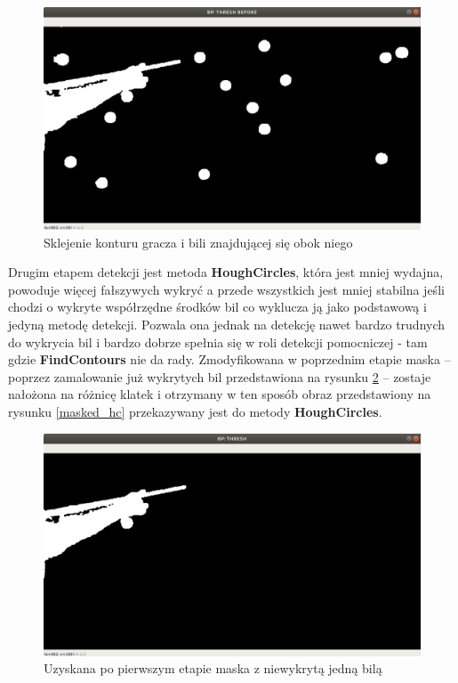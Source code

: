 \documentclass[12pt]{article}
\begin{document}
\begin{enumerate} [noitemsep]
    \begin{figure}[!ht]
        \centering
        \includegraphics[width=15cm]{./images/obrazki/bp/thresh_before_hc2.png}
        \caption{Sklejenie konturu gracza i bili znajdującej się obok niego}
        \label{thresh_before_hc}
    \end{figure}


    Drugim etapem detekcji jest metoda \textbf{HoughCircles}, która jest mniej wydajna, powoduje więcej fałszywych wykryć a przede wszystkich jest mniej stabilna jeśli chodzi o wykryte współrzędne środków bil co wyklucza ją jako podstawową i jedyną metodę detekcji. Pozwala ona jednak na detekcję nawet bardzo trudnych do wykrycia bil i bardzo dobrze spełnia się w roli detekcji pomocniczej - tam gdzie \textbf{FindContours} nie da rady. Zmodyfikowana w poprzednim etapie maska – poprzez zamalowanie już wykrytych bil przedstawiona na rysunku \ref{thresh_hc} – zostaje nałożona na różnicę klatek i otrzymany w ten sposób obraz przedstawiony na rysunku \ref{masked_hc} przekazywany jest do metody \textbf{HoughCircles}.

    \newpage

    \begin{figure}[!ht]
        \centering
        \includegraphics[width=15cm]{./images/obrazki/bp/thresh_hc.png}
        \caption{Uzyskana po pierwszym etapie maska z niewykrytą jedną bilą}
        \label{thresh_hc}
    \end{figure}


\end{enumerate}
\end{document}
